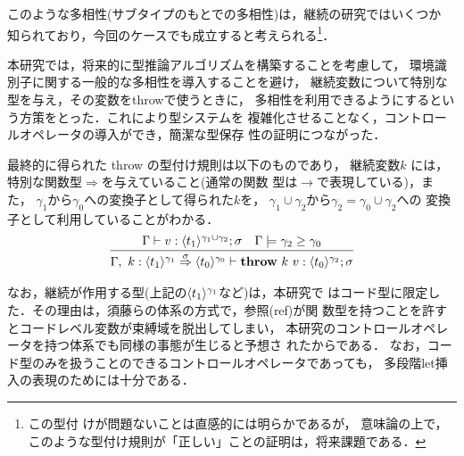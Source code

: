 このような多相性(サブタイプのもとでの多相性)は，継続の研究ではいくつか
知られており，今回のケースでも成立すると考えられる\footnote{この型付
  けが問題ないことは直感的には明らかであるが，
  意味論の上で，このような型付け規則が「正しい」ことの証明は，将来課題である．}．

本研究では，将来的に型推論アルゴリズムを構築することを考慮して，
環境識別子に関する一般的な多相性を導入することを避け，
継続変数について特別な型を与え，その変数をthrowで使うときに，
多相性を利用できるようにするという方策をとった．これにより型システムを
複雑化させることなく，コントロールオペレータの導入ができ，簡潔な型保存
性の証明につながった．

最終的に得られた throw の型付け規則は以下のものであり，
継続変数$k$ には，特別な関数型$\Rightarrow$を与えていること(通常の関数
型は$\rightarrow$で表現している)，また，
$\gamma_1$から$\gamma_0$への変換子として得られた$k$を，
$\gamma_1\cup \gamma_2$から$\gamma_2 = \gamma_0 \cup \gamma_2$への
変換子として利用していることがわかる．
\[
  \infer
  {\Gamma,~k:\contT{\codeT{t_1}{\gamma_1}}{\codeT{t_0}{\gamma_0}}{\sigma}
    \vdash \throw{k}{v} : \codeT{t_0}{\gamma_2} ; \sigma}
  {\Gamma
    \vdash v : \codeT{t_1}{\gamma_1 \cup \gamma_2} ; \sigma
    & \Gamma \models \gamma_2 \ord \gamma_0
  }
\]

なお，継続が作用する型(上記の$\langle{t_1}\rangle^{\gamma_1}$など)は，本研究で
はコード型に限定した．その理由は，須藤らの体系の方式で，参照(ref)が関
数型を持つことを許すとコードレベル変数が束縛域を脱出してしまい，
本研究のコントロールオペレータを持つ体系でも同様の事態が生じると予想さ
れたからである．
なお，コード型のみを扱うことのできるコントロールオペレータであっても，
多段階let挿入の表現のためには十分である．

